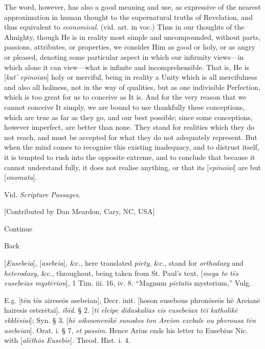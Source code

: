 The word, however, has also a good meaning and
use, as expressive of the nearest approximation in human thought to
the supernatural truths of Revelation, and thus equivalent to \emph{economical}.
(vid. art. in voc.) Thus in our thoughts of the Almighty, though He is
in reality most simple and uncompounded, without parts, passions,
attributes, or properties, we consider Him as good or holy, or as
angry or pleased, denoting some particular aspect in which our
infirmity views—in which alone it can view—what is infinite and
incomprehensible. That is, He is [\emph{kat'
epinoian}] holy or merciful, being in reality a Unity which
is all mercifulness and also all holiness, not in the way of
qualities, but as one indivisible Perfection, which is too great for
us to conceive as It is. And for the very reason that we cannot
conceive It simply, we are bound to use thankfully these
conceptions, which are true as far as they go, and our best possible;
since some conceptions, however imperfect, are better than none. They
stand for realities which they do not reach, and must be accepted for
what they do not adequately represent. But when the mind comes to
recognise this existing inadequacy, and to distrust itself, it is
tempted to rush into the opposite extreme, and to conclude that
because it cannot understand fully, it does not realise anything, or
that its [\emph{epinoiai}]
are but [\emph{onomata}].

\xsection{[Epispeiras]}

Vid. \emph{Scripture Passages}.

[Contributed by Dan Meardon, Cary, NC, USA]

Continue

Back

\xsection{[Eusebeia]}

[\emph{Eusebeia}], [\emph{asebeia}],
\&c., here translated \emph{piety}, \&c., stand for \emph{orthodoxy}
and \emph{heterodoxy}, \&c., throughout, being taken from St. Paul's
text, [\emph{mega to t\={e}s eusebeias myst\={e}rion}], 1 Tim.
iii. 16, iv. 8. ``Magnum \emph{pietatis} mysterium,'' Vulg.

E.g. [t\={e}n t\={e}s airese\={o}s
asebeian], Decr. init. [hoson eusebous phron\={e}se\={o}s h\={e}
Areian\={e} hairesis ester\={e}tai]. \emph{ibid}. § 2. [\emph{ti
eleipe didaskalias eis eusebeian t\={e}i katholik\={e} ekkl\={e}siai}];
Syn. § 3. [\emph{h\={e} oikoumenik\={e} sunodos ton Areion exebale
ou pherousa t\={e}n asebeian}]. Orat. i. § 7, \emph{et passim}.
Hence Arius ends his letter to Eusebius Nic. with [\emph{al\={e}th\={o}s
Eusebie}]. Theod. Hist. i. 4.

